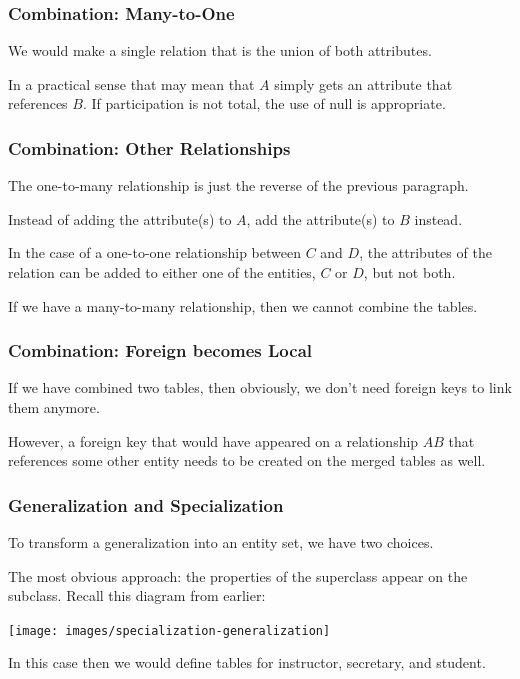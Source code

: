 \begin{frame}
\frametitle{Combination: Many-to-One}

We would  make a single relation that is the union of both attributes. 

In a practical sense that may mean that $A$ simply gets an attribute that references $B$.  If participation is not total, the use of null is appropriate.

\end{frame}



\begin{frame}
\frametitle{Combination: Other Relationships}

The one-to-many relationship is just the reverse of the previous paragraph.

Instead of adding the attribute(s) to $A$, add the attribute(s) to $B$ instead. 

In the case of a one-to-one relationship between $C$ and $D$, the attributes of the relation can be added to either one of the entities, $C$ or $D$, but not both.

If we have a many-to-many relationship, then we cannot combine the tables. 

\end{frame}



\begin{frame}
\frametitle{Combination: Foreign becomes Local}

If we have combined two tables, then obviously, we don't need foreign keys to link them anymore. 

However, a foreign key that would have appeared on a relationship $AB$ that references some other entity needs to be created on the merged tables as well.


\end{frame}



\begin{frame}
\frametitle{Generalization and Specialization}

To transform a generalization into an entity set, we have two choices.

The most obvious approach: the properties of the superclass appear on the subclass. Recall this diagram from earlier:

\begin{center}
\texttt{[image: images/specialization-generalization]}
\end{center}

In this case then we would define tables for instructor, secretary, and student.

\end{frame}



